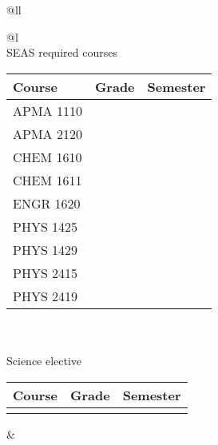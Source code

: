 \documentclass[10pt,letter]{book}
\begin{document}
\noindent\begin{tabular}{@{}ll}
\noindent\begin{tabular}{@{}l}
\\
SEAS required courses \\
\begin{tabular}{|l|l|l|}\hline
\bf Course & \bf Grade & \bf Semester \\ \hline \hline
APMA 1110 & & \\ \hline
APMA 2120 & & \\ \hline
CHEM 1610 & & \\ \hline
CHEM 1611 & & \\ \hline
ENGR 1620 & & \\ \hline
PHYS 1425 & & \\ \hline
PHYS 1429 & & \\ \hline
PHYS 2415 & & \\ \hline
PHYS 2419 & & \\ \hline
\end{tabular} \\
\\
Science elective \\
\begin{tabular}{|l|l|l|} \hline
\bf Course & \bf Grade & \bf Semester \\ \hline \hline
\hspace{0.7in} & & \\ \hline
\end{tabular}
\end{tabular}

&


\end{tabular}
\end{document}
